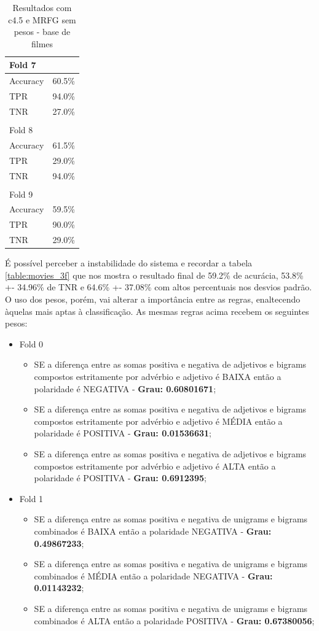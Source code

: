 \documentclass[template.tex]{subfiles}
\begin{document}
\begin{table}[H]
\begin{tabular}{ll}
	Fold 7 \\ \hline
    Accuracy &  60.5\% \\
	TPR &  94.0\% \\
	TNR &  27.0\% \\ \\
	
	Fold 8 \\ \hline
    Accuracy &  61.5\% \\
	TPR &  29.0\% \\
	TNR &  94.0\% \\ \\
	
	Fold 9 \\ \hline
    Accuracy &  59.5\% \\
	TPR &  90.0\% \\
	TNR &  29.0\% \\
    \end{tabular}
    \caption{Resultados com c4.5 e MRFG sem pesos - base de filmes}
    \label{table:movie_folds_2}
\end{table}

É possível perceber a instabilidade do sistema e recordar a tabela \ref{table:movies_3f} que nos mostra o resultado final de 59.2\% de acurácia, 53.8\% +- 34.96\% de TNR e 64.6\% +- 37.08\% com altos percentuais nos desvios padrão. O uso dos pesos, porém, vai alterar a importância entre as regras, enaltecendo àquelas mais aptas à classificação. As mesmas regras acima recebem os seguintes pesos:

\begin{itemize}
\item Fold 0
\begin{itemize}
\item SE a diferença entre as somas positiva e negativa de adjetivos e bigrams compostos estritamente por advérbio e adjetivo é BAIXA então a polaridade é NEGATIVA - \textbf{Grau: 0.60801671};
\item SE a diferença entre as somas positiva e negativa de adjetivos e bigrams compostos estritamente por advérbio e adjetivo é MÉDIA então a polaridade é POSITIVA - \textbf{Grau: 0.01536631};
\item SE a diferença entre as somas positiva e negativa de adjetivos e bigrams compostos estritamente por advérbio e adjetivo é ALTA então a polaridade é POSITIVA  - \textbf{Grau: 0.6912395};
\end{itemize}
\item Fold 1
\begin{itemize}
\item SE a diferença entre as somas positiva e negativa de unigrams e bigrams combinados é BAIXA então a polaridade NEGATIVA  - \textbf{Grau: 0.49867233};
\item SE a diferença entre as somas positiva e negativa de unigrams e bigrams combinados é MÉDIA então a polaridade NEGATIVA  - \textbf{Grau: 0.01143232};
\item SE a diferença entre as somas positiva e negativa de unigrams e bigrams combinados é ALTA então a polaridade POSITIVA  - \textbf{Grau: 0.67380056};
\end{itemize}
\end{itemize}
\end{document}

